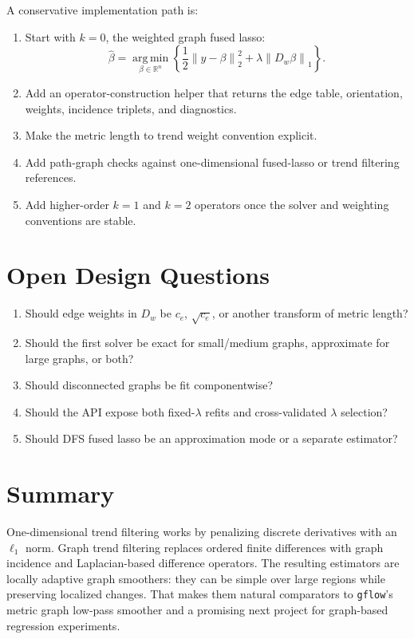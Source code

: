 \documentclass[11pt]{article}
\newcommand{\R}{\mathbb R}
\newcommand{\norm}[1]{\left\lVert #1 \right\rVert}
\newcommand{\argmin}{\operatorname*{arg\,min}}
\begin{document}
A conservative implementation path is:
\begin{enumerate}
  \item Start with \(k=0\), the weighted graph fused lasso:
  \[
    \widehat\beta
    =
    \argmin_{\beta\in\R^n}
    \left\{
    \frac{1}{2}\norm{y-\beta}_2^2
    +
    \lambda\norm{D_w\beta}_1
    \right\}.
  \]
  \item Add an operator-construction helper that returns the edge table,
        orientation, weights, incidence triplets, and diagnostics.
  \item Make the metric length to trend weight convention explicit.
  \item Add path-graph checks against one-dimensional fused-lasso or trend
        filtering references.
  \item Add higher-order \(k=1\) and \(k=2\) operators once the solver and
        weighting conventions are stable.
\end{enumerate}

\section{Open Design Questions}

\begin{enumerate}
  \item Should edge weights in \(D_w\) be \(c_e\), \(\sqrt{c_e}\), or another
        transform of metric length?
  \item Should the first solver be exact for small/medium graphs, approximate
        for large graphs, or both?
  \item Should disconnected graphs be fit componentwise?
  \item Should the API expose both fixed-\(\lambda\) refits and cross-validated
        \(\lambda\) selection?
  \item Should DFS fused lasso be an approximation mode or a separate
        estimator?
\end{enumerate}

\section{Summary}

One-dimensional trend filtering works by penalizing discrete derivatives with
an \(\ell_1\) norm.  Graph trend filtering replaces ordered finite differences
with graph incidence and Laplacian-based difference operators.  The resulting
estimators are locally adaptive graph smoothers: they can be simple over large
regions while preserving localized changes.  That makes them natural
comparators to \texttt{gflow}'s metric graph low-pass smoother and a promising
next project for graph-based regression experiments.
\end{document}
